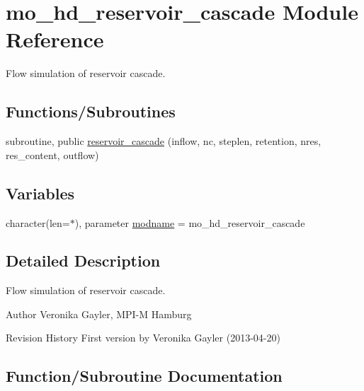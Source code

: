 \hypertarget{namespacemo__hd__reservoir__cascade}{}\section{mo\+\_\+hd\+\_\+reservoir\+\_\+cascade Module Reference}
\label{namespacemo__hd__reservoir__cascade}


Flow simulation of reservoir cascade.  


\subsection*{Functions/\+Subroutines}
\begin{DoxyCompactItemize}
\item 
subroutine, public \hyperlink{namespacemo__hd__reservoir__cascade_a2fa442fd7d7849b36ae0cc5b9f39cbcd}{reservoir\+\_\+cascade} (inflow, nc, steplen, retention, nres, res\+\_\+content, outflow)
\end{DoxyCompactItemize}
\subsection*{Variables}
\begin{DoxyCompactItemize}
\item 
character(len=$\ast$), parameter \hyperlink{namespacemo__hd__reservoir__cascade_a8b0cd1df229795ce555d9973dbd65c30}{modname} = \textquotesingle{}mo\+\_\+hd\+\_\+reservoir\+\_\+cascade\textquotesingle{}
\end{DoxyCompactItemize}


\subsection{Detailed Description}
Flow simulation of reservoir cascade. 

\begin{DoxyAuthor}{Author}
Veronika Gayler, M\+P\+I-\/\+M Hamburg
\end{DoxyAuthor}
\begin{DoxyParagraph}{Revision History}
First version by Veronika Gayler (2013-\/04-\/20) 
\end{DoxyParagraph}


\subsection{Function/\+Subroutine Documentation}
\hypertarget{namespacemo__hd__reservoir__cascade_a2fa442fd7d7849b36ae0cc5b9f39cbcd}{}

